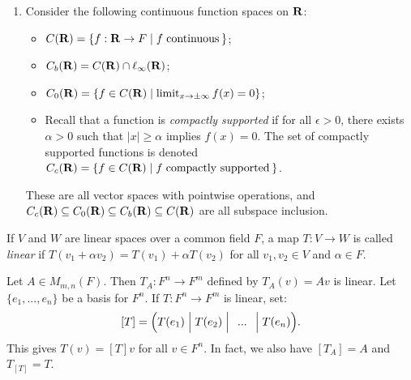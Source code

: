 \begin{example}
\begin{enumerate}[label = (\arabic*),itemsep=1pt,topsep=3pt]
            \item Consider the following continuous function spaces on $\mathbf{R}$:
                \begin{itemize}
                    \item $C(\mathbf{R}) = \{f:\mathbf{R} \rightarrow F \mid f \hspace{3pt}\text{continuous}\hspace{2pt}\}$;
                    \item $C_b(\mathbf{R}) = C(\mathbf{R}) \cap \ell_\infty(\mathbf{R})$;
                    \item $C_0(\mathbf{R}) = \{f \in C(\mathbf{R}) \mid \operatorname*{limit}_{x \rightarrow \pm\infty} f(x) = 0\}$;
                    \item Recall that a function is \textit{compactly supported} if for all $\epsilon > 0$, there exists $\alpha > 0$ such that $|x| \geq \alpha$ implies $f(x) = 0$. The set of compactly supported functions is denoted $C_c(\mathbf{R}) = \{f \in C(\mathbf{R}) \mid f \hspace{3pt}\text{compactly supported}\hspace{2pt}\}$.
                \end{itemize}
            These are all vector spaces with pointwise operations, and $C_c(\mathbf{R}) \subseteq C_0(\mathbf{R}) \subseteq C_b(\mathbf{R}) \subseteq C(\mathbf{R})$ are all subspace inclusion.
        \end{enumerate}
    \end{example}

    \begin{definition}
        If $V$ and $W$ are linear spaces over a common field $F$, a map $T:V \rightarrow W$ is called \textit{linear} if $T(v_1 + \alpha v_2) = T(v_1) + \alpha T(v_2)$ for all $v_1,v_2 \in V$ and $\alpha \in F$.
    \end{definition}
    
    \begin{example}
        Let $A \in M_{m,n}(F)$. Then $T_A:F^n \rightarrow F^m$ defined by $T_A(v) = Av$ is linear. Let $\{e_1,...,e_n\}$ be a basis for $F^n$. If $T:F^n \rightarrow F^m$ is linear, set:
            \begin{equation*}
            \begin{split}
                [T] = \Bigl( T(e_1) \Bigm\vert T(e_2) \Bigm\vert \hspace{4.5pt}...\hspace{4.5pt}\Bigm\vert T(e_n) \Bigr).
            \end{split}
            \end{equation*}
        This gives $T(v) = [T]v$ for all $v \in F^n$. In fact, we also have $[T_A] = A$ and $T_{[T]} = T$.
    \end{example}

